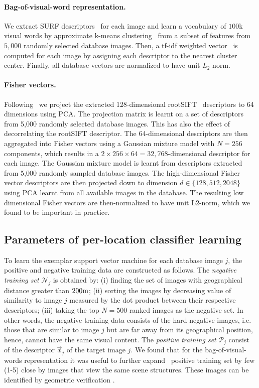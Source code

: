       \paragraph{Bag-of-visual-word representation.}
         We extract SURF descriptors~\cite{Bay06} for each image and learn a vocabulary of $100$k visual words by approximate k-means clustering~\cite{Philbin07} from a subset of features from $5,000$ randomly selected database images. Then, a tf-idf weighted vector~\cite{Sivic03} is computed for each image by assigning each descriptor to the nearest cluster center.  Finally, all database vectors are normalized to have unit $L_2$ norm.
        
      \paragraph{Fisher vectors.}
        Following~\cite{Jegou12} we project the extracted 128-dimensional rootSIFT~\cite{Arandjelovic12} descriptors to 64 dimensions using PCA. The projection matrix is learnt on a set of descriptors from 5,000 randomly selected database images. This has also the effect of decorrelating the rootSIFT descriptor. The 64-dimensional descriptors are then aggregated into Fisher vectors using a Gaussian mixture model with $N=256$ components, which results in a $2\times256\times64 = 32,768$-dimensional descriptor for each image.  
        The Gaussian mixture model is learnt from descriptors extracted from 5,000 randomly sampled database images. The  high-dimensional Fisher vector descriptors are then projected down to dimension $d\in\{128,512, 2048\}$ using PCA learnt from all available images in the database. The resulting low dimensional Fisher vectors are then-normalized to have unit L2-norm, which we found to be important in practice.
      
    \subsection{Parameters of per-location classifier learning}
      To learn the exemplar support vector machine for each database image $j$, the positive and negative training data are constructed as follows. 
      The \emph{negative training set} $\mathcal N_j$ is obtained by: (i) finding the set of images with geographical distance greater than $200{\rm m}$; (ii)  sorting the images by decreasing value of similarity to image $j$ measured by the dot product between their respective descriptors; (iii) taking the top $N=500$ ranked images as the negative set. 
      In other words, the negative training data consists of the hard negative images, i.e. those that are similar to image $j$ but are far away from its geographical position, hence, cannot have the same visual content. 
      The \emph{positive training set} $\mathcal P_j$ consist of the descriptor $\vec{x}_j$ of the target image $j$. 
      We found that for the bag-of-visual-words representation it was useful to further expand~\cite{Chum07b} positive training set by few (1-5) close by images that view the same scene structures. These images can be identified by geometric verification \cite{Philbin07}.   

